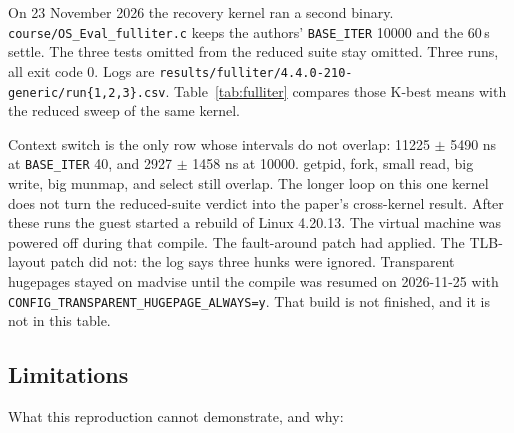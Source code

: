 \documentclass[11pt]{article}
\begin{document}
On 23 November 2026 the recovery kernel ran a second binary. \texttt{course/OS\_Eval\_fulliter.c} keeps the authors' \texttt{BASE\_ITER} 10000 and the 60\,s settle. The three tests omitted from the reduced suite stay omitted. Three runs, all exit code 0. Logs are \texttt{results/fulliter/4.4.0-210-generic/run\{1,2,3\}.csv}. Table~\ref{tab:fulliter} compares those K-best means with the reduced sweep of the same kernel.

\begin{table}[ht]
\centering
\caption{One kernel at two iteration counts. Each cell is the mean $\pm$ sample standard deviation of three K-best runs.}
\label{tab:fulliter}

\end{table}

Context switch is the only row whose intervals do not overlap: 11225 $\pm$ 5490 ns at \texttt{BASE\_ITER} 40, and 2927 $\pm$ 1458 ns at 10000. getpid, fork, small read, big write, big munmap, and select still overlap. The longer loop on this one kernel does not turn the reduced-suite verdict into the paper's cross-kernel result. After these runs the guest started a rebuild of Linux 4.20.13. The virtual machine was powered off during that compile. The fault-around patch had applied. The TLB-layout patch did not: the log says three hunks were ignored. Transparent hugepages stayed on madvise until the compile was resumed on 2026-11-25 with \texttt{CONFIG\_TRANSPARENT\_HUGEPAGE\_ALWAYS=y}. That build is not finished, and it is not in this table.

\subsection{Limitations}
\label{sec:limitations}

What this reproduction cannot demonstrate, and why:
\end{document}
